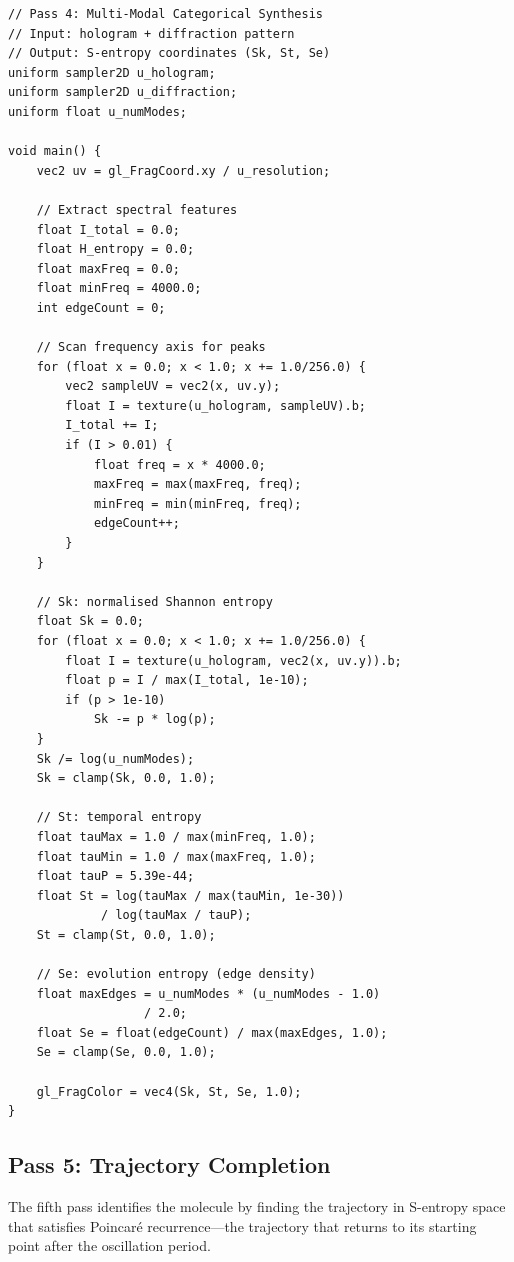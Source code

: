 \documentclass[11pt,a4paper]{article}
\theoremstyle{definition}
\theoremstyle{remark}
\begin{document}
\begin{lstlisting}[style=glsl, caption={Pass 4: Categorical synthesis shader}, label={lst:pass4}]
// Pass 4: Multi-Modal Categorical Synthesis
// Input: hologram + diffraction pattern
// Output: S-entropy coordinates (Sk, St, Se)
uniform sampler2D u_hologram;
uniform sampler2D u_diffraction;
uniform float u_numModes;

void main() {
    vec2 uv = gl_FragCoord.xy / u_resolution;

    // Extract spectral features
    float I_total = 0.0;
    float H_entropy = 0.0;
    float maxFreq = 0.0;
    float minFreq = 4000.0;
    int edgeCount = 0;

    // Scan frequency axis for peaks
    for (float x = 0.0; x < 1.0; x += 1.0/256.0) {
        vec2 sampleUV = vec2(x, uv.y);
        float I = texture(u_hologram, sampleUV).b;
        I_total += I;
        if (I > 0.01) {
            float freq = x * 4000.0;
            maxFreq = max(maxFreq, freq);
            minFreq = min(minFreq, freq);
            edgeCount++;
        }
    }

    // Sk: normalised Shannon entropy
    float Sk = 0.0;
    for (float x = 0.0; x < 1.0; x += 1.0/256.0) {
        float I = texture(u_hologram, vec2(x, uv.y)).b;
        float p = I / max(I_total, 1e-10);
        if (p > 1e-10)
            Sk -= p * log(p);
    }
    Sk /= log(u_numModes);
    Sk = clamp(Sk, 0.0, 1.0);

    // St: temporal entropy
    float tauMax = 1.0 / max(minFreq, 1.0);
    float tauMin = 1.0 / max(maxFreq, 1.0);
    float tauP = 5.39e-44;
    float St = log(tauMax / max(tauMin, 1e-30))
             / log(tauMax / tauP);
    St = clamp(St, 0.0, 1.0);

    // Se: evolution entropy (edge density)
    float maxEdges = u_numModes * (u_numModes - 1.0)
                   / 2.0;
    float Se = float(edgeCount) / max(maxEdges, 1.0);
    Se = clamp(Se, 0.0, 1.0);

    gl_FragColor = vec4(Sk, St, Se, 1.0);
}
\end{lstlisting}

\subsection{Pass 5: Trajectory Completion}

The fifth pass identifies the molecule by finding the trajectory in S-entropy space that satisfies Poincar{\'e} recurrence---the trajectory that returns to its starting point after the oscillation period.
\end{document}
